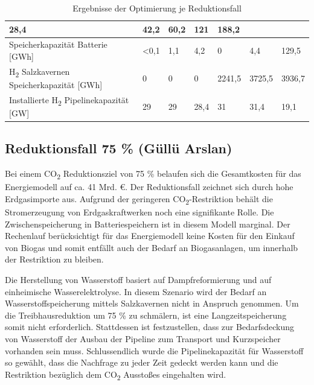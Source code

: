 \begin{table}[!ht]
\begin{tabular}{|l|llllll|}
      \multicolumn{1}{l|}{28,4} &
      \multicolumn{1}{l|}{42,2} &
      \multicolumn{1}{l|}{60,2} &
      \multicolumn{1}{l|}{121} &
      188,2 \\ \hline
    {Speicherkapazität Batterie {[}GWh{]}} &
      \multicolumn{1}{l|}{\textless{}0,1} &
      \multicolumn{1}{l|}{1,1} &
      \multicolumn{1}{l|}{4,2} &
      \multicolumn{1}{l|}{0} &
      \multicolumn{1}{l|}{4,4} &
      129,5 \\ \hline
    {H\textsubscript{2} Salzkavernen Speicherkapazität {[}GWh{]}} &
      \multicolumn{1}{l|}{0} &
      \multicolumn{1}{l|}{0} &
      \multicolumn{1}{l|}{0} &
      \multicolumn{1}{l|}{2241,5} &
      \multicolumn{1}{l|}{3725,5} &
      3936,7 \\ \hline
    {Installierte H\textsubscript{2} Pipelinekapazität {[}GW{]}} &
      \multicolumn{1}{l|}{29} &
      \multicolumn{1}{l|}{29} &
      \multicolumn{1}{l|}{28,4} &
      \multicolumn{1}{l|}{31} &
      \multicolumn{1}{l|}{31,4} &
      19,1 \\ \hline
    \end{tabular}
    \caption{Ergebnisse der Optimierung je Reduktionsfall
    }
    \label{tab:ueberreduktion}
    \end{table}

\subsection{Reduktionsfall 75 \% (Güllü Arslan)}
Bei einem CO\textsubscript{2} Reduktionsziel von 75 \% belaufen sich die Gesamtkosten für das Energiemodell auf ca. 41 Mrd. €. Der Reduktionsfall zeichnet sich durch hohe Erdgasimporte aus. Aufgrund der geringeren CO\textsubscript{2}-Restriktion behält die Stromerzeugung von Erdgaskraftwerken noch eine signifikante Rolle. Die Zwischenspeicherung in Batteriespeichern ist in diesem Modell marginal. Der Rechenlauf berücksichtigt für das Energiemodell keine Kosten für den Einkauf von Biogas und somit entfällt auch der Bedarf an Biogasanlagen, um innerhalb der Restriktion zu bleiben. 

Die Herstellung von Wasserstoff basiert auf Dampfreformierung und auf einheimische Wasserelektrolyse. In diesem Szenario wird der Bedarf an Wasserstoffspeicherung mittels Salzkavernen nicht in Anspruch genommen. Um die Treibhausreduktion um 75 \% zu schmälern, ist eine Langzeitspeicherung somit nicht erforderlich. Stattdessen ist festzustellen, dass zur Bedarfsdeckung von Wasserstoff der Ausbau der Pipeline zum Transport und Kurzspeicher vorhanden sein muss. Schlussendlich wurde die Pipelinekapazität für Wasserstoff so gewählt, dass die Nachfrage zu jeder Zeit gedeckt werden kann und die Restriktion bezüglich dem CO\textsubscript{2} Ausstoßes eingehalten wird. 

